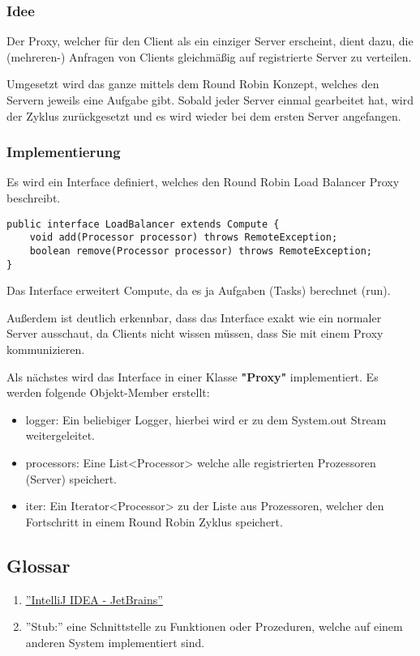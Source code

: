 \subsubsection{Idee}
Der Proxy, welcher für den Client als ein einziger Server erscheint, dient dazu, die (mehreren-) Anfragen von Clients gleichmäßig auf registrierte Server zu verteilen.

Umgesetzt wird das ganze mittels dem Round Robin Konzept, welches den Servern jeweils eine Aufgabe gibt. Sobald jeder Server einmal gearbeitet hat, wird der Zyklus zurückgesetzt und es wird wieder bei dem ersten Server angefangen.

\subsubsection{Implementierung}
Es wird ein Interface definiert, welches den Round Robin Load Balancer Proxy beschreibt.

\begin{lstlisting}[style=Java, caption=Proxy Implementation - LoadBalancer Interface]
public interface LoadBalancer extends Compute {
    void add(Processor processor) throws RemoteException;
	boolean remove(Processor processor) throws RemoteException;
}
\end{lstlisting}

Das Interface erweitert Compute, da es ja Aufgaben (Tasks) berechnet (run).

Außerdem ist deutlich erkennbar, dass das Interface exakt wie ein normaler Server ausschaut, da Clients nicht wissen müssen, dass Sie mit einem Proxy kommunizieren.

Als nächstes wird das Interface in einer Klasse \textbf{"Proxy"} implementiert.
Es werden folgende Objekt-Member erstellt:

\begin{itemize}
	\item logger: Ein beliebiger Logger, hierbei wird er zu dem System.out Stream weitergeleitet.
	\item processors: Eine List<Processor> welche alle registrierten Prozessoren (Server) speichert.
	\item iter: Ein Iterator<Processor> zu der Liste aus Prozessoren, welcher den Fortschritt in einem Round Robin Zyklus speichert.
\end{itemize}

\subsection{Glossar}
\begin{enumerate}
    \item \href{https://www.jetbrains.com/idea}{\color{blue}\underline{''IntelliJ IDEA - JetBrains''}}
    \item ''Stub:'' eine Schnittstelle zu Funktionen oder Prozeduren, welche auf einem anderen System implementiert sind.
\end{enumerate}


